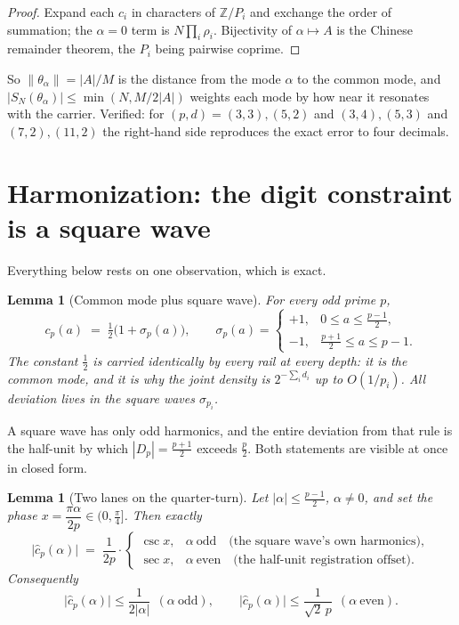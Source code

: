 \documentclass[11pt]{article}
\newtheorem{lemma}[theorem]{Lemma}
\begin{document}
\begin{proof}
Expand each $c_i$ in characters of $\mathbb Z/P_i$ and exchange the order of summation;
the $\alpha=0$ term is $N\prod_i\rho_i$.  Bijectivity of $\alpha\mapsto A$ is the
Chinese remainder theorem, the $P_i$ being pairwise coprime.
\end{proof}

So $\|\theta_\alpha\|=|A|/M$ is the distance from the mode $\alpha$ to the common mode,
and $|S_N(\theta_\alpha)|\le\min(N,M/2|A|)$ weights each mode by how near it resonates
with the carrier.  Verified: for $(p,d)=(3,3),(5,2)$ and $(3,4),(5,3)$ and
$(7,2),(11,2)$ the right-hand side reproduces the exact error to four decimals.

\section{Harmonization: the digit constraint is a square wave}

Everything below rests on one observation, which is exact.

\begin{lemma}[Common mode plus square wave]\label{lem:sq}
For every odd prime $p$,
\[
c_p(a)\;=\;\tfrac12\bigl(1+\sigma_p(a)\bigr),\qquad
\sigma_p(a)=\begin{cases}+1,&0\le a\le\frac{p-1}2,\\[2pt]-1,&\frac{p+1}2\le a\le p-1.\end{cases}
\]
The constant $\tfrac12$ is carried identically by every rail at every depth: it is the
common mode, and it is why the joint density is $2^{-\sum_id_i}$ up to $O(1/p_i)$.  All
deviation lives in the square waves $\sigma_{p_i}$.
\end{lemma}

A square wave has only odd harmonics, and the entire deviation from that rule is the
half-unit by which $|D_p|=\frac{p+1}2$ exceeds $\frac p2$.  Both statements are visible
at once in closed form.

\begin{lemma}[Two lanes on the quarter-turn]\label{lem:lanes}
Let $|\alpha|\le\frac{p-1}2$, $\alpha\ne0$, and set the phase
$x=\dfrac{\pi\alpha}{2p}\in\bigl(0,\tfrac\pi4\bigr]$.  Then \emph{exactly}
\[
\bigl|\hat c_p(\alpha)\bigr|\;=\;\frac{1}{2p}\cdot
\begin{cases}
\csc x, & \alpha\ \text{odd}\quad\text{(the square wave's own harmonics)},\\[4pt]
\sec x, & \alpha\ \text{even}\quad\text{(the half-unit registration offset)}.
\end{cases}
\]
Consequently
\[
\bigl|\hat c_p(\alpha)\bigr|\le\frac1{2|\alpha|}\ \ (\alpha\ \text{odd}),
\qquad
\bigl|\hat c_p(\alpha)\bigr|\le\frac{1}{\sqrt2\,p}\ \ (\alpha\ \text{even}).
\]
\end{lemma}
\end{document}
